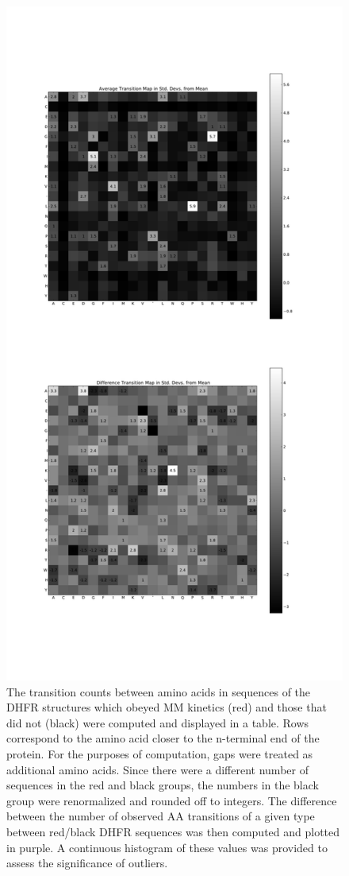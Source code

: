 \documentclass[a4paper,11pt]{article}
\begin{document}
\begin{figure}
\centerline{\includegraphics[width=8in]{transitions.pdf}}
\caption[Amino Acid Transition Matrix]{The transition counts between amino acids in sequences of the DHFR structures which obeyed MM kinetics (red) and those that did not (black) were computed and displayed in a table. Rows correspond to the amino acid closer to the n-terminal end of the protein. For the purposes of computation, gaps were treated as additional amino acids. Since there were a different number of sequences in the red and black groups, the numbers in the black group were renormalized and rounded off to integers. The difference between the number of observed AA transitions of a given type between red/black DHFR sequences was then computed and plotted in purple. A continuous histogram of these values was provided to assess the significance of outliers.}
\end{figure}
\end{document}

